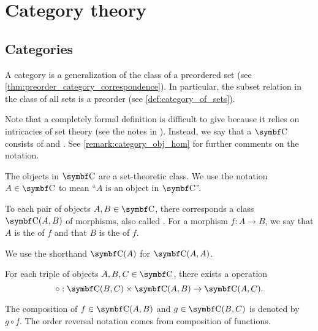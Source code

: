 \section{Category theory}\label{sec:category_theory}
\subsection{Categories}\label{subsec:categories}

\begin{definition}\label{def:category}\cite[definition 1.1.1]{Leinster2014}
  A category is a generalization of the class of a preordered set (see \cref{thm:preorder_category_correspondence}). In particular, the subset relation in the class of all sets is a preorder (see \cref{def:category_of_sets}).

  Note that a completely formal definition is difficult to give because it relies on intricacies of set theory (see the notes in ). Instead, we say that a  \( \Cat{C} \) consists of  and . See \cref{remark:category_obj_hom} for further comments on the notation.

  \begin{defenum}[series=def:category]
     The objects in \( \Cat{C} \) are a set-theoretic class. We use the notation \( A \in \Cat{C} \) to mean \enquote{\( A \) is an object in \( \Cat{C} \)}.

     To each pair of objects \( A, B \in \Cat{C} \), there corresponds a class \( \Cat{C}(A, B) \) of morphisms, also called . For a morphism \( f: A \to B \), we say that \( A \) is the  of \( f \) and that \( B \) is the  of \( f \).

    We use the shorthand \( \Cat{C}(A) \) for \( \Cat{C}(A, A) \).

     For each triple of objects \( A, B, C \in \Cat{C} \), there exists a  operation
    \begin{equation*}
      \circ: \Cat{C}(B, C) \times \Cat{C}(A, B) \to \Cat{C}(A, C).
    \end{equation*}

    The composition of \( f \in \Cat{C}(A, B) \) and \( g \in \Cat{C}(B, C) \) is denoted by \( g \circ f \). The order reversal notation comes from composition of functions.
  \end{defenum}


\end{definition}
